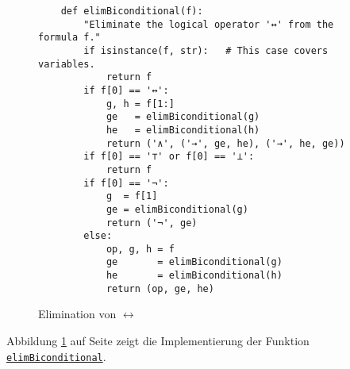 \begin{figure}[!ht]
  \centering
\begin{verbatim}
    def elimBiconditional(f):
        "Eliminate the logical operator '↔' from the formula f."
        if isinstance(f, str):   # This case covers variables.
            return f
        if f[0] == '↔':
            g, h = f[1:]
            ge   = elimBiconditional(g)
            he   = elimBiconditional(h)
            return ('∧', ('→', ge, he), ('→', he, ge))
        if f[0] == '⊤' or f[0] == '⊥':
            return f
        if f[0] == '¬':
            g  = f[1]
            ge = elimBiconditional(g)
            return ('¬', ge)
        else:
            op, g, h = f
            ge       = elimBiconditional(g)
            he       = elimBiconditional(h)
            return (op, ge, he)
\end{verbatim}
\vspace*{-0.3cm}
  \caption{Elimination von $\leftrightarrow$}
  \label{fig:elimBiconditional}
\end{figure} 
Abbildung
\ref{fig:elimBiconditional} auf Seite \pageref{fig:elimBiconditional} zeigt die Implementierung der
Funktion 
\href{https://github.com/karlstroetmann/Logic/blob/master/Python/CNF.ipynb}{\texttt{elimBiconditional}}.

